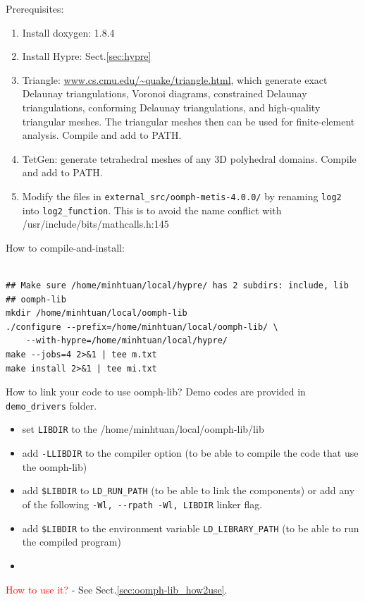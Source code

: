 Prerequisites:
\begin{enumerate}
  \item Install doxygen: 1.8.4
  \item Install Hypre: Sect.\ref{sec:hypre}
  \item Triangle: \url{www.cs.cmu.edu/~quake/triangle.html}, which generate
  exact Delaunay triangulations, Voronoi diagrams, constrained Delaunay
  triangulations, conforming Delaunay triangulations, and high-quality
  triangular meshes. The triangular meshes then can be used for finite-element
  analysis. Compile and add to PATH. 
  \item TetGen: generate tetrahedral meshes of any 3D polyhedral domains.
  Compile and add to PATH.
  \item Modify the files in \verb!external_src/oomph-metis-4.0.0/! by renaming
  \verb!log2! into \verb!log2_function!. This is to avoid the name conflict with
  /usr/include/bits/mathcalls.h:145
\end{enumerate}


How to compile-and-install:
\begin{verbatim}

## Make sure /home/minhtuan/local/hypre/ has 2 subdirs: include, lib
## oomph-lib
mkdir /home/minhtuan/local/oomph-lib
./configure --prefix=/home/minhtuan/local/oomph-lib/ \ 
    --with-hypre=/home/minhtuan/local/hypre/
make --jobs=4 2>&1 | tee m.txt
make install 2>&1 | tee mi.txt
\end{verbatim}

How to link your code to use oomph-lib? Demo codes are provided in
\verb!demo_drivers! folder.
\begin{itemize}
  \item set \verb!LIBDIR! to the /home/minhtuan/local/oomph-lib/lib
  \item add \verb!-LLIBDIR! to the compiler option (to be able to compile the
  code that use the oomph-lib)
  \item add \verb!$LIBDIR! to \verb!LD_RUN_PATH! (to be able to link the
  components) or add any of the following \verb!-Wl, --rpath -Wl, LIBDIR!
  linker flag.
  \item add \verb!$LIBDIR! to the environment variable \verb!LD_LIBRARY_PATH!
  (to be able to run the compiled program)
  \item 
\end{itemize}

\textcolor{red}{How to use it?} - See Sect.\ref{sec:oomph-lib_how2use}.

